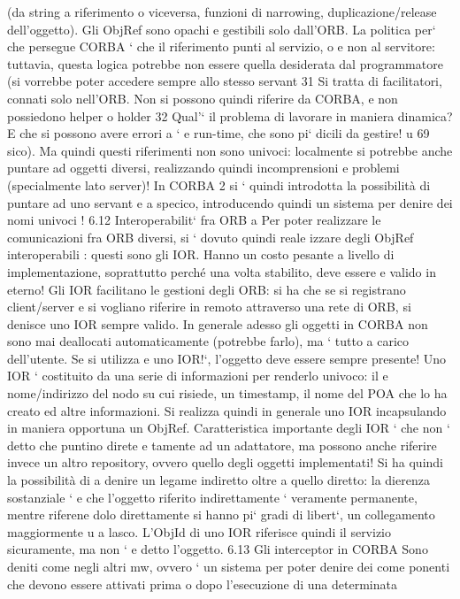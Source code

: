 \documentclass[a4paper,12pt]{article}
\begin{document}
(da string a riferimento o viceversa, funzioni di narrowing, duplicazione/release
dell'oggetto). Gli ObjRef sono opachi e gestibili solo dall'ORB.
La politica per` che persegue CORBA ` che il riferimento punti al servizio,
o
e
non al servitore: tuttavia, questa logica potrebbe non essere quella desiderata dal programmatore (si vorrebbe poter
accedere sempre allo stesso servant
31 Si tratta di facilitatori, connati solo nell'ORB. Non si possono quindi riferire da CORBA,
e non possiedono helper o holder
32 Qual'` il problema di lavorare in maniera dinamica? E che si possono avere errori a
`
e
run-time, che sono pi` dicili da gestire!
u
69
sico). Ma quindi questi riferimenti non sono univoci: localmente si potrebbe
anche puntare ad oggetti diversi, realizzando quindi incomprensioni e problemi
(specialmente lato server)!
In CORBA 2 si ` quindi introdotta la possibilità di puntare ad uno servant
e
a
specico, introducendo quindi un sistema per denire dei nomi univoci !
6.12
Interoperabilit` fra ORB
a
Per poter realizzare le comunicazioni fra ORB diversi, si ` dovuto quindi reale
izzare degli ObjRef interoperabili : questi sono gli IOR. Hanno un costo pesante
a livello di implementazione, soprattutto perché una volta stabilito, deve essere
e
valido in eterno!
Gli IOR facilitano le gestioni degli ORB: si ha che se si registrano client/server
e si vogliano riferire in remoto attraverso una rete di ORB, si denisce uno IOR
sempre valido. In generale adesso gli oggetti in CORBA non sono mai deallocati
automaticamente (potrebbe farlo), ma ` tutto a carico dell'utente. Se si utilizza
e
uno IOR!`, l'oggetto deve essere sempre presente!
Uno IOR ` costituito da una serie di informazioni per renderlo univoco: il
e
nome/indirizzo del nodo su cui risiede, un timestamp, il nome del POA che lo ha
creato ed altre informazioni. Si realizza quindi in generale uno IOR incapsulando
in maniera opportuna un ObjRef.
Caratteristica importante degli IOR ` che non ` detto che puntino direte
e
tamente ad un adattatore, ma possono anche riferire invece un altro repository, ovvero quello degli oggetti
implementati! Si ha quindi la possibilità di
a
denire un legame indiretto oltre a quello diretto: la dierenza sostanziale `
e
che l'oggetto riferito indirettamente ` veramente permanente, mentre riferene
dolo direttamente si hanno pi` gradi di libert`, un collegamento maggiormente
u
a
lasco. L'ObjId di uno IOR riferisce quindi il servizio sicuramente, ma non `
e
detto l'oggetto.
6.13
Gli interceptor in CORBA
Sono deniti come negli altri mw, ovvero ` un sistema per poter denire dei come
ponenti che devono essere attivati prima o dopo l'esecuzione di una determinata
\end{document}
